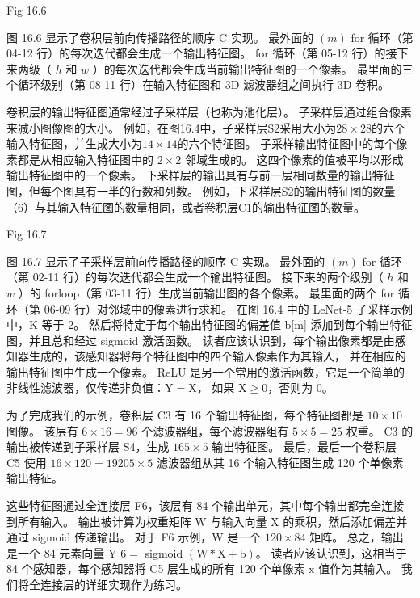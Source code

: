 {\color{red} Fig 16.6}

图 16.6 显示了卷积层前向传播路径的顺序 $\mathrm{C}$ 实现。 
最外面的 $(m)$ for 循环（第 04-12 行）的每次迭代都会生成一个输出特征图。 
for 循环（第 05-12 行）的接下来两级（ $h$ 和 $w$ ）的每次迭代都会生成当前输出特征图的一个像素。 
最里面的三个循环级别（第 08-11 行）在输入特征图和 3D 滤波器组之间执行 3D 卷积。

卷积层的输出特征图通常经过子采样层（也称为池化层）。 子采样层通过组合像素来减小图像图的大小。 
例如，在图16.4中，子采样层S2采用大小为$28×28$的六个输入特征图，并生成大小为$14×14$的六个特征图。 
子采样输出特征图中的每个像素都是从相应输入特征图中的 $2 \times 2$ 邻域生成的。 
这四个像素的值被平均以形成输出特征图中的一个像素。 
下采样层的输出具有与前一层相同数量的输出特征图，但每个图具有一半的行数和列数。 
例如，下采样层S2的输出特征图的数量（6）与其输入特征图的数量相同，或者卷积层$\mathrm{C} 1$的输出特征图的数量。

{\color{red} Fig 16.7}

图 16.7 显示了子采样层前向传播路径的顺序 $\mathrm{C}$ 实现。 
最外面的 $(m)$ for 循环（第 02-11 行）的每次迭代都会生成一个输出特征图。 
接下来的两个级别（ $h$ 和 $w$ ）的 forloop（第 03-11 行）生成当前输出图的各个像素。 
最里面的两个 for 循环（第 06-09 行）对邻域中的像素进行求和。 
在图 16.4 中的 LeNet-5 子采样示例中，$\mathrm{K}$ 等于 2。 
然后将特定于每个输出特征图的偏差值 b[m] 添加到每个输出特征图，并且总和经过 sigmoid 激活函数。 
读者应该认识到，每个输出像素都是由感知器生成的，该感知器将每个特征图中的四个输入像素作为其输入，
并在相应的输出特征图中生成一个像素。 
ReLU 是另一个常用的激活函数，它是一个简单的非线性滤波器，仅传递非负值：$\mathrm{Y}=\mathrm{X}$，
如果 $\mathrm{X} \geq 0$，否则为 0。

为了完成我们的示例，卷积层 C3 有 16 个输出特征图，每个特征图都是 $10 × 10$ 图像。 
该层有 $6 \times 16=96$ 个滤波器组，每个滤波器组有 $5 \times 5=25$ 权重。 
$\mathrm{C} 3$ 的输出被传递到子采样层 S4，生成 $165 \times 5$ 输出特征图。 
最后，最后一个卷积层 C5 使用 $16 × 120=19205 \times 5$ 滤波器组从其 16 个输入特征图生成 120 个单像素输出特征。

这些特征图通过全连接层 F6，该层有 84 个输出单元，其中每个输出都完全连接到所有输入。 
输出被计算为权重矩阵 $\mathrm{W}$ 与输入向量 $\mathrm{X}$ 的乘积，然后添加偏差并通过 sigmoid 传递输出。 
对于 F6 示例，$\mathrm{W}$ 是一个 $120 \times 84$ 矩阵。 
总之，输出是一个 84 元素向量 Y $6=$ sigmoid $(\mathrm{W} * \mathrm{X}+\mathrm{b})$。 
读者应该认识到，这相当于 84 个感知器，每个感知器将 C5 层生成的所有 120 个单像素 $\mathrm{x}$ 值作为其输入。 
我们将全连接层的详细实现作为练习。

